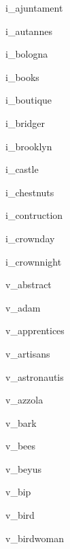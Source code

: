 i\_ajuntament\par
i\_autannes\par
i\_bologna\par
i\_books\par
i\_boutique\par
i\_bridger\par
i\_brooklyn\par
i\_castle\par
i\_chestnuts\par
i\_contruction\par
i\_crownday\par
i\_crownnight\par
v\_abstract\par
v\_adam\par
v\_apprentices\par
v\_artisans\par
v\_astronautis\par
v\_azzola\par
v\_bark\par
v\_bees\par
v\_beyus\par
v\_bip\par
v\_bird\par
v\_birdwoman\par
